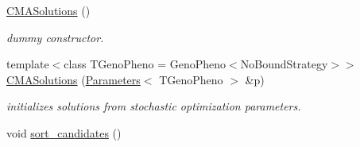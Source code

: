\begin{DoxyCompactItemize}
\item 
\hypertarget{classlibcmaes_1_1CMASolutions_adc7194ca66777833c1980d11bc79649b}{\hyperlink{classlibcmaes_1_1CMASolutions_adc7194ca66777833c1980d11bc79649b}{C\+M\+A\+Solutions} ()}\label{classlibcmaes_1_1CMASolutions_adc7194ca66777833c1980d11bc79649b}

\begin{DoxyCompactList}\small\item\em dummy constructor. \end{DoxyCompactList}\item 
{\footnotesize template$<$class T\+Geno\+Pheno  = Geno\+Pheno$<$\+No\+Bound\+Strategy$>$$>$ }\\\hyperlink{classlibcmaes_1_1CMASolutions_acb424e8b0329ee8790be4156aef68c4f}{C\+M\+A\+Solutions} (\hyperlink{classlibcmaes_1_1Parameters}{Parameters}$<$ T\+Geno\+Pheno $>$ \&p)
\begin{DoxyCompactList}\small\item\em initializes solutions from stochastic optimization parameters. \end{DoxyCompactList}\item 
\hypertarget{classlibcmaes_1_1CMASolutions_a48934296b4295080786cbc97302448f7}{void \hyperlink{classlibcmaes_1_1CMASolutions_a48934296b4295080786cbc97302448f7}{sort\+\_\+candidates} ()}\label{classlibcmaes_1_1CMASolutions_a48934296b4295080786cbc97302448f7}


\end{DoxyCompactItemize}
